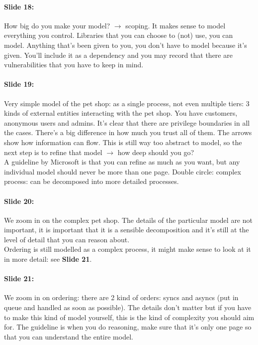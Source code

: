 \documentclass[10pt,a4paper]{report}
\begin{document}
\paragraph{Slide 18:} How big do you make your model? $\rightarrow$ scoping. It makes sense to model everything you control. Libraries that you can choose to (not) use, you can model. Anything that's been given to you, you don't have to model because it's given. You'll include it as a dependency and you may record that there are vulnerabilities that you have to keep in mind.

\paragraph{Slide 19:} Very simple model of the pet shop: as a single process, not even multiple tiers: 3 kinds of external entities interacting with the pet shop. You have customers, anonymous users and admins. It's clear that there are privilege boundaries in all the cases. There's a big difference in how much you trust all of them. The arrows show how information can flow. This is still way too abstract to model, so the next step is to refine that model $\rightarrow$ how deep should you go?\\
A guideline by Microsoft is that you can refine as much as you want, but any individual model should never be more than one page. Double circle: complex process: can be decomposed into more detailed processes.

\paragraph{Slide 20:} We zoom in on the complex pet shop. The details of the particular model are not important, it is important that it is a sensible decomposition and it's still at the level of detail that you can reason about.\\ 
Ordering is still modelled as a complex process, it might make sense to look at it in more detail: see \textbf{Slide 21}.

\paragraph{Slide 21:} We zoom in on ordering: there are 2 kind of orders: syncs and asyncs (put in queue and handled as soon as possible). The details don't matter but if you have to make this kind of model yourself, this is the kind of complexity you should aim for. The guideline is when you do reasoning, make sure that it's only one page so that you can understand the entire model. 
\end{document}
